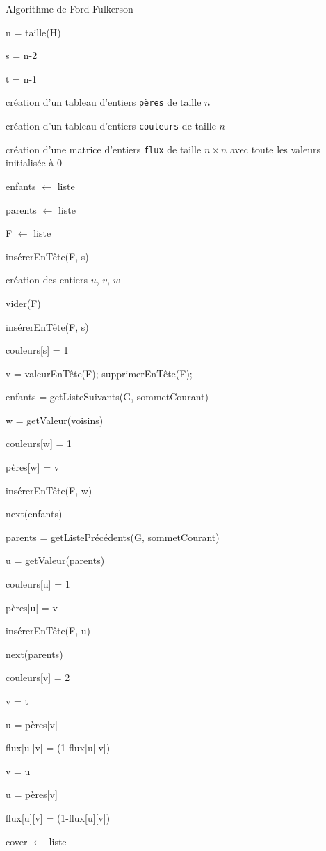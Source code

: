 \documentclass[a4paper,10pt]{article}
\begin{document}
\bigskip
\bigskip
\begin{algorithm}[H]
\caption{Algorithme de Ford-Fulkerson}
\BlankLine
n = taille(H)

s = n-2

t = n-1

création d'un tableau d'entiers \texttt{pères} de taille $n$

création d'un tableau d'entiers \texttt{couleurs} de taille $n$

création d'une matrice d'entiers \texttt{flux} de taille $n\times n$ avec toute les valeurs initialisée à 0

enfants $\leftarrow$ liste

parents $\leftarrow$ liste

F $\leftarrow$ liste

insérerEnTête(F, s)

création des entiers $u$, $v$, $w$

{
	vider(F)
	
	insérerEnTête(F, s)
	
	couleurs[s] = 1
	
	{
		v = valeurEnTête(F);
		supprimerEnTête(F);
	
		enfants = getListeSuivants(G, sommetCourant)
		
		{
			w = getValeur(voisins)
			
			{
				couleurs[w] = 1
				
				pères[w] = v
				
				insérerEnTête(F, w)
			}
			next(enfants)
		}

		parents = getListePrécédents(G, sommetCourant)
		
		{
			u = getValeur(parents)
			
			{
				couleurs[u] = 1
				
				pères[u] = v
				
				insérerEnTête(F, u)
			}
			next(parents)
		}
		
		couleurs[v] = 2
	}
	
	v = t
	
	u = pères[v]
	{	
		flux[u][v] = (1-flux[u][v])
		
		v = u
		
		u = pères[v]
	}
	flux[u][v] = (1-flux[u][v])
}

cover  $\leftarrow$ liste



\end{algorithm}
\bigskip
\end{document}
